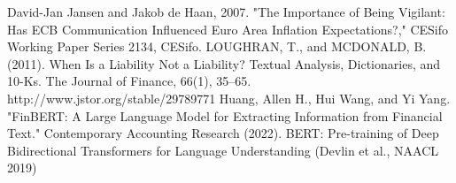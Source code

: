 \documentclass[12pt, letterpaper]{article}
\begin{document}
David-Jan Jansen and Jakob de Haan, 2007. "The Importance of Being Vigilant: Has ECB Communication Influenced Euro Area Inflation Expectations?," CESifo Working Paper Series 2134, CESifo.
\bigskip
LOUGHRAN, T., and MCDONALD, B. (2011). When Is a Liability Not a Liability? Textual Analysis, Dictionaries, and 10-Ks. The Journal of Finance, 66(1), 35–65. http://www.jstor.org/stable/29789771
\bigskip
Huang, Allen H., Hui Wang, and Yi Yang. "FinBERT: A Large Language Model for Extracting Information from Financial Text." Contemporary Accounting Research (2022).
\bigskip
BERT: Pre-training of Deep Bidirectional Transformers for Language Understanding (Devlin et al., NAACL 2019)
\end{document}
